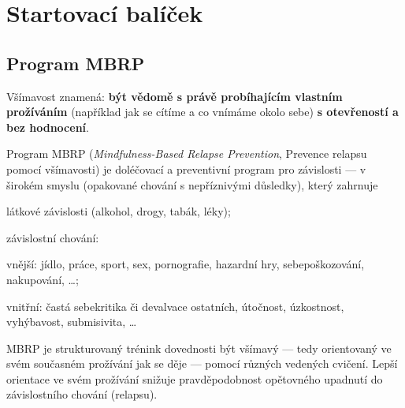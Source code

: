 \bgroup
	\cleardoublepage
	\setcounter{section}{-1}
	\titleformat{\section}[frame]{}{}{1em}{\Large\scshape\bfseries}
	\section{Startovací balíček}
\egroup	



\subsection{Program MBRP}
	Všímavost znamená: \textbf{být vědomě s právě probíhajícím vlastním prožíváním} (například jak se cítíme a co vnímáme okolo sebe) \textbf{s otevřeností a bez hodnocení}.

	Program MBRP (\emph{Mindfulness-Based Relapse Prevention}, Prevence relapsu pomocí všímavosti) je doléčovací a preventivní program pro závislosti — v širokém smyslu (opakované chování s nepříznivými důsledky), který zahrnuje
	\begin{itemize*}
		\item látkové závislosti (alkohol, drogy, tabák, léky);
		\item závislostní chování:
			\begin{itemize*}
				\item vnější: jídlo, práce, sport, sex, pornografie, hazardní hry, sebepoškozování, nakupování, …;
				\item vnitřní: častá sebekritika či devalvace ostatních, útočnost, úzkostnost, vyhýbavost, submisivita, …
			\end{itemize*}
	\end{itemize*}

	MBRP je strukturovaný trénink dovednosti být všímavý — tedy orientovaný ve svém současném prožívání jak se děje — pomocí různých vedených cvičení. Lepší orientace ve svém prožívání snižuje pravděpodobnost opětovného upadnutí do závislostního chování (relapsu).

